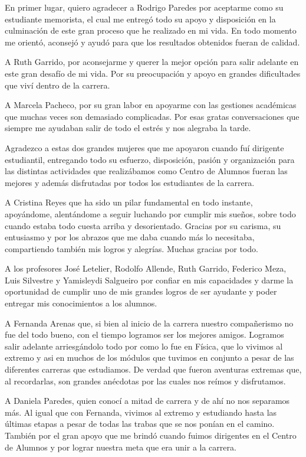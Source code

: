 
\begin{acknowledgment}
    En primer lugar, quiero agradecer a Rodrigo Paredes por aceptarme como su estudiante memorista, el cual me entregó todo su apoyo y disposición en la culminación de este gran proceso que he realizado en mi vida. En todo momento me orientó, aconsejó y ayudó para que los resultados obtenidos fueran de calidad.
    
    A Ruth Garrido, por aconsejarme y querer la mejor opción para salir adelante en este gran desafío de mi vida. Por su preocupación y apoyo en grandes dificultades que viví dentro de la carrera.
    
    A Marcela Pacheco, por su gran labor en apoyarme con las gestiones académicas que muchas veces son demasiado complicadas. Por esas gratas conversaciones que siempre me ayudaban salir de todo el estrés y nos alegraba la tarde.
    
    Agradezco a estas dos grandes mujeres que me apoyaron cuando fuí dirigente estudiantil, entregando todo su esfuerzo, disposición, pasión y organización para las distintas actividades que realizábamos como Centro de Alumnos fueran las mejores y además disfrutadas por todos los estudiantes de la carrera.
    
    A Cristina Reyes que ha sido un pilar fundamental en todo instante, apoyándome, alentándome a seguir luchando por cumplir mis sueños, sobre todo cuando estaba todo cuesta arriba y desorientado. Gracias por su carisma, su entusiasmo y por los abrazos que me daba cuando más lo necesitaba, compartiendo también mis logros y alegrías. Muchas gracias por todo.
    
    A los profesores José Letelier, Rodolfo Allende, Ruth Garrido, Federico Meza, Luis Silvestre y Yamisleydi Salgueiro por confiar en mis capacidades y darme la oportunidad de cumplir uno de mis grandes logros de ser ayudante y poder entregar mis conocimientos a los alumnos.

    A Fernanda Arenas que, si bien al inicio de la carrera nuestro compañerismo no fue del todo bueno, con el tiempo logramos ser los mejores amigos. Logramos salir adelante arriesgándolo todo por como lo fue en Física, que lo vivimos al extremo y asi en muchos de los módulos que tuvimos en conjunto a pesar de las diferentes carreras que estudiamos. De verdad que fueron aventuras extremas que, al recordarlas, son grandes anécdotas por las cuales nos reímos y disfrutamos.
    
    A Daniela Paredes, quien conocí a mitad de carrera y de ahí no nos separamos más. Al igual que con Fernanda, vivimos al extremo y estudiando hasta las últimas etapas a pesar de todas las trabas que se nos ponían en el camino. También por el gran apoyo que me brindó cuando fuimos dirigentes en el Centro de Alumnos y por lograr nuestra meta que era unir a la carrera.
    

\end{acknowledgment}
